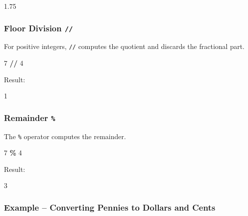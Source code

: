 \documentclass[
]{article}
\newenvironment{Shaded}{\begin{snugshade}}{\end{snugshade}}
\newcommand{\DecValTok}[1]{\textcolor[rgb]{0.00,0.00,0.81}{#1}}
\newcommand{\NormalTok}[1]{#1}
\newcommand{\OperatorTok}[1]{\textcolor[rgb]{0.81,0.36,0.00}{\textbf{#1}}}
\begin{document}
\begin{Shaded}
\begin{Highlighting}[]
\NormalTok{1.75}
\end{Highlighting}
\end{Shaded}

\subsubsection{\texorpdfstring{Floor Division
\texttt{//}}{Floor Division //}}\label{floor-division}

For positive integers, \texttt{//} computes the quotient and discards
the fractional part.

\begin{Shaded}
\begin{Highlighting}[]
\DecValTok{7} \OperatorTok{//} \DecValTok{4}
\end{Highlighting}
\end{Shaded}

Result:

\begin{Shaded}
\begin{Highlighting}[]
\NormalTok{1}
\end{Highlighting}
\end{Shaded}

\subsubsection{\texorpdfstring{Remainder
\texttt{\%}}{Remainder \%}}\label{remainder}

The \texttt{\%} operator computes the remainder.

\begin{Shaded}
\begin{Highlighting}[]
\DecValTok{7} \OperatorTok{\%} \DecValTok{4}
\end{Highlighting}
\end{Shaded}

Result:

\begin{Shaded}
\begin{Highlighting}[]
\NormalTok{3}
\end{Highlighting}
\end{Shaded}

\subsubsection{Example -- Converting Pennies to Dollars and
Cents}\label{example-converting-pennies-to-dollars-and-cents}
\end{document}

